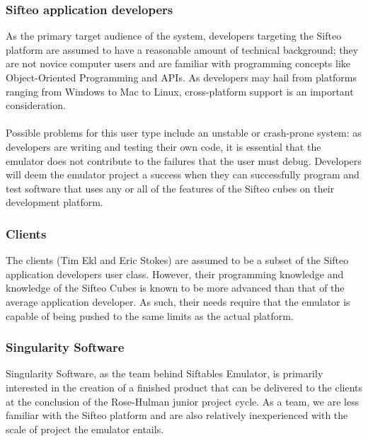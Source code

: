 \documentclass[12pt]{article}
\begin{document}
                          \subsubsection{Sifteo application developers}
                          As the primary target audience of the system, developers targeting the Sifteo platform are assumed to have a reasonable amount of technical background; they are not novice computer users and are familiar with programming concepts like \gls{Object-Oriented Programming} and \gls{API}s. As developers may hail from platforms ranging from \gls{Windows} to \gls{Mac} to \gls{Linux}, \gls{cross-platform support} is an important consideration.\\\\
                          Possible problems for this user type include an unstable or crash-prone system: as developers are writing and testing their own code, it is essential that the emulator does not contribute to the failures that the user must debug. Developers will deem the emulator project a success when they can successfully program and test software that uses any or all of the features of the Sifteo cubes on their development platform.

                          \subsubsection{Clients}
                          The clients (Tim Ekl and Eric Stokes) are assumed to be a subset of the Sifteo application developers user class. However, their programming knowledge and knowledge of the Sifteo Cubes is known to be more advanced than that of the average application developer. As such, their needs require that the emulator is capable of being pushed to the same limits as the actual platform.

                          \subsubsection{Singularity Software}
                          Singularity Software, as the team behind Siftables Emulator, is primarily interested in the creation of a finished product that can be delivered to the clients at the conclusion of the Rose-Hulman junior project cycle. As a team, we are less familiar with the Sifteo platform and are also relatively inexperienced with the scale of project the emulator entails.
\end{document}
